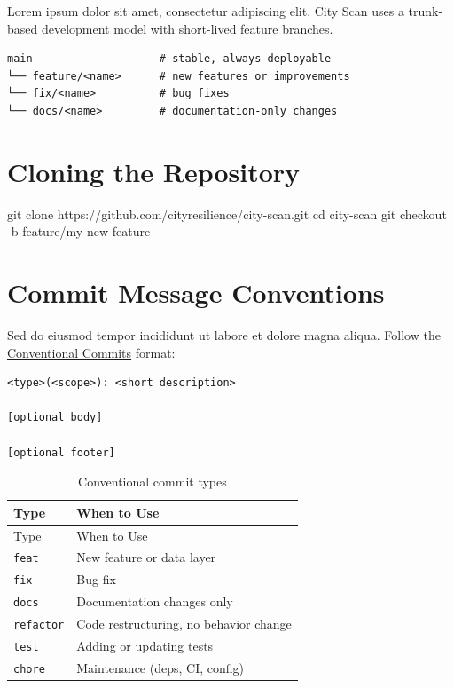 \documentclass[
  letterpaper,
  DIV=11,
  numbers=noendperiod]{scrreprt}
\newenvironment{Shaded}{\begin{snugshade}}{\end{snugshade}}
\newcommand{\AttributeTok}[1]{\textcolor[rgb]{0.40,0.45,0.13}{#1}}
\newcommand{\BuiltInTok}[1]{\textcolor[rgb]{0.00,0.23,0.31}{#1}}
\newcommand{\FunctionTok}[1]{\textcolor[rgb]{0.28,0.35,0.67}{#1}}
\newcommand{\NormalTok}[1]{\textcolor[rgb]{0.00,0.23,0.31}{#1}}
\begin{document}
Lorem ipsum dolor sit amet, consectetur adipiscing elit. City Scan uses
a trunk-based development model with short-lived feature branches.

\begin{verbatim}
main                    # stable, always deployable
└── feature/<name>      # new features or improvements
└── fix/<name>          # bug fixes
└── docs/<name>         # documentation-only changes
\end{verbatim}

\section{Cloning the Repository}\label{cloning-the-repository}

\begin{Shaded}
\begin{Highlighting}[]
\FunctionTok{git}\NormalTok{ clone https://github.com/cityresilience/city{-}scan.git}
\BuiltInTok{cd}\NormalTok{ city{-}scan}
\FunctionTok{git}\NormalTok{ checkout }\AttributeTok{{-}b}\NormalTok{ feature/my{-}new{-}feature}
\end{Highlighting}
\end{Shaded}

\section{Commit Message Conventions}\label{commit-message-conventions}

Sed do eiusmod tempor incididunt ut labore et dolore magna aliqua.
Follow the \href{https://www.conventionalcommits.org/}{Conventional
Commits} format:

\begin{verbatim}
<type>(<scope>): <short description>

[optional body]

[optional footer]
\end{verbatim}

\begin{longtable}[]{@{}ll@{}}
\caption{Conventional commit
types}\label{tbl-commit-types}\tabularnewline
\toprule\noalign{}
Type & When to Use \\
\midrule\noalign{}
\endfirsthead
\toprule\noalign{}
Type & When to Use \\
\midrule\noalign{}
\endhead
\bottomrule\noalign{}
\endlastfoot
\texttt{feat} & New feature or data layer \\
\texttt{fix} & Bug fix \\
\texttt{docs} & Documentation changes only \\
\texttt{refactor} & Code restructuring, no behavior change \\
\texttt{test} & Adding or updating tests \\
\texttt{chore} & Maintenance (deps, CI, config) \\
\end{longtable}
\end{document}
